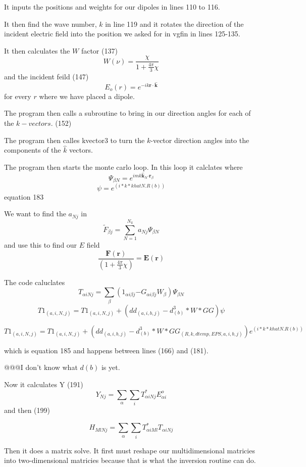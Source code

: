 \documentclass{article}
\begin{document}
It inputs the positions and weights for our dipoles in lines 110 to 116.

It then find the wave number, $k$ in line 119 and it rotates the direction
of the incident electric field into the position we asked for in vgfin in
lines 125-135.

It then calculates the $W$ factor (137) 
\[
W\left( \nu \right) =\frac{\chi }{1+\frac{4\pi }{3}\chi } 
\]%
and the incident feild (147) 
\[
E_{o}\left( r\right) =e^{-ik\mathbf{r}\cdot \mathbf{\hat{k}}} 
\]%
for every $r$ where we have placed a dipole.

The program then calls a subroutine to bring in our direction angles for
each of the $k-vectors.$ (152)

The program then calles kvector3 to turn the $k$-vector direction angles
into the components of the $\hat{k}$ vectors.

The program then starts the monte carlo loop. In this loop it calclates
where 
\begin{equation}
\Psi _{\beta N}=e^{imk\mathbf{\hat{k}}_{N}\mathbf{\cdot r}_{\beta }}
\label{PSYFUN}
\end{equation}%
\[
\psi =e^{(i\ast k\ast khatN.R(b))} 
\]%
equation 183

We want to find the $a_{Nj}$ in 
\begin{equation}
\tilde{F}_{\beta j}\mathbf{=}\sum_{N=1}^{N_{k}}a_{Nj}\Psi _{\beta N}
\end{equation}%
and use this to find our $E$ field%
\[
\frac{\mathbf{F}(\mathbf{r})}{(1+\frac{4\pi }{3}\chi )}=\mathbf{E}(\mathbf{r}%
) 
\]

The code caluclates 
\[
T_{\alpha iNj}=\sum_{\beta }\left( 1_{\alpha i\beta j}\mathbf{-}G_{\alpha
i\beta j}W_{\beta }\right) \Psi _{\beta N} 
\]%
\[
T1_{(a,i,N,j)}=T1_{(a,i,N,j)}+(dd_{(a,i,b,j)}-d_{(b)}^{3}\ast W\ast GG)\psi 
\]

\[
T1_{(a,i,N,j)}=T1_{(a,i,N,j)}+(dd_{(a,i,b,j)}-d_{(b)}^{3}\ast W\ast
GG_{(R,k,dtemp,EPS,a,i,b,j)})e^{(i\ast k\ast khatN.R(b))} 
\]

which is equation 185 and happens between lines (166) and (181).

@@@I don't know what $d\left( b\right) $ is yet.

Now it calculates Y (191)%
\[
Y_{Nj}=\sum_{\alpha }\sum_{i}T_{\alpha iNj}^{\ast }E_{\alpha i}^{o} 
\]%
and then (199)

\[
H_{MlNj}=\sum_{\alpha }\sum_{i}T_{\alpha iMl}^{\ast }T_{\alpha iNj} 
\]

Then it does a matrix solve. It first must reshape our multidimensional
matricies into two-dimensional matricies because that is what the inversion
routine can do.
\end{document}
